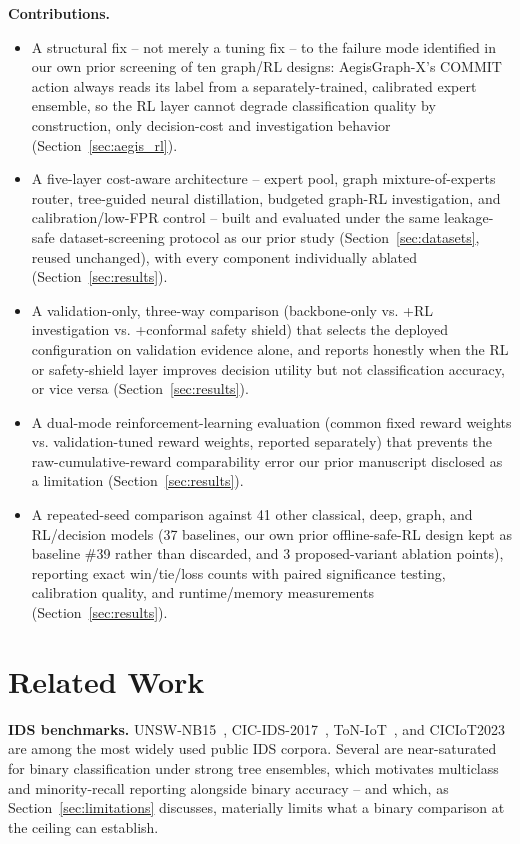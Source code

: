 \documentclass[journal]{IEEEtran}
\begin{document}
\textbf{Contributions.}
\begin{itemize}
\item A structural fix -- not merely a tuning fix -- to the failure mode
identified in our own prior screening of ten graph/RL designs: AegisGraph-X's
COMMIT action always reads its label from a separately-trained, calibrated
expert ensemble, so the RL layer cannot degrade classification quality by
construction, only decision-cost and investigation behavior
(Section~\ref{sec:aegis_rl}).
\item A five-layer cost-aware architecture -- expert pool, graph
mixture-of-experts router, tree-guided neural distillation, budgeted graph-RL
investigation, and calibration/low-FPR control -- built and evaluated under
the same leakage-safe dataset-screening protocol as our prior study
(Section~\ref{sec:datasets}, reused unchanged), with every component
individually ablated (Section~\ref{sec:results}).
\item A validation-only, three-way comparison (backbone-only vs. +RL
investigation vs. +conformal safety shield) that selects the deployed
configuration on validation evidence alone, and reports honestly when the RL
or safety-shield layer improves decision utility but not classification
accuracy, or vice versa (Section~\ref{sec:results}).
\item A dual-mode reinforcement-learning evaluation (common fixed reward
weights vs. validation-tuned reward weights, reported separately) that
prevents the raw-cumulative-reward comparability error our prior manuscript
disclosed as a limitation (Section~\ref{sec:results}).
\item A repeated-seed comparison against 41 other classical, deep, graph, and
RL/decision models (37 baselines, our own prior offline-safe-RL design kept
as baseline \#39 rather than discarded, and 3 proposed-variant ablation
points), reporting exact win/tie/loss counts with paired significance
testing, calibration quality, and runtime/memory
measurements (Section~\ref{sec:results}).
\end{itemize}

\section{Related Work}
\label{sec:related}

\textbf{IDS benchmarks.} UNSW-NB15~\cite{moustafa2015unswnb15},
CIC-IDS-2017~\cite{sharafaldin2018cicids}, ToN-IoT~\cite{alsaedi2020toniot},
and CICIoT2023~\cite{neto2023ciciot2023} are among the most widely used
public IDS corpora. Several are near-saturated for binary classification
under strong tree ensembles, which motivates multiclass and minority-recall
reporting alongside binary accuracy -- and which, as
Section~\ref{sec:limitations} discusses, materially limits what a binary
comparison at the ceiling can establish.
\end{document}

